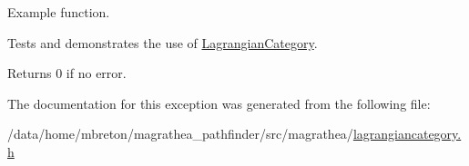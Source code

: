 Example function. 

Tests and demonstrates the use of \hyperlink{exceptionmagrathea_1_1LagrangianCategory}{Lagrangian\-Category}. \begin{DoxyReturn}{Returns}
0 if no error. 
\end{DoxyReturn}


The documentation for this exception was generated from the following file\-:\begin{DoxyCompactItemize}
\item 
/data/home/mbreton/magrathea\-\_\-pathfinder/src/magrathea/\hyperlink{lagrangiancategory_8h}{lagrangiancategory.\-h}\end{DoxyCompactItemize}
